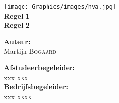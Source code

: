 \frenchspacing


\setcounter{secnumdepth}{2}

\begin{center}
  \texttt{[image: Graphics/images/hva.jpg]}\\[3cm]
  { \huge \bfseries Regel 1 \\ Regel 2 \\[12cm] } 
  \begin{minipage}{0.4\textwidth}
    \vspace{0pt}
    \begin{flushleft} \large
      \textbf{\Large Auteur:}\\
      \Large Martijn \textsc{Bogaard}
    \end{flushleft}
  \end{minipage}
  \begin{minipage}{0.4\textwidth}
    \vspace{0pt}
    \begin{flushright} \large
      \textbf{\Large Afstudeerbegeleider:} \\
      \Large xxx \textsc{xxx}        \\[1cm]
      \textbf{\Large Bedrijfsbegeleider:} \\
      \Large xxx \textsc{xxxx}
    \end{flushright}
  \end{minipage}
\end{center}